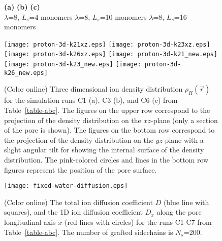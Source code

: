 \documentclass[3p,english,preprint]{elsarticle}
\begin{document}
\begin{figure}[!ht]  \hspace{2cm}
{\Large \bf(a)}   \hspace{4.5cm} {\Large \bf (b)}   \hspace{5cm}  {\Large \bf (c)}   \\
 \hspace{1.0cm} $\lambda$=8, $L_s$=4  monomers  
 \hspace{2cm}   $\lambda$=8, $L_s$=10 monomers  
 \hspace{2cm}   $\lambda$=8, $L_s$=16 monomers 

\texttt{[image: proton-3d-k21xz.eps]} 
\texttt{[image: proton-3d-k23xz.eps]}
\texttt{[image: proton-3d-k26xz.eps]}
\texttt{[image: proton-3d-k21\_new.eps]}
\texttt{[image: proton-3d-k23\_new.eps]}
\texttt{[image: proton-3d-k26\_new.eps]}
\caption{(Color online)   Three dimensional ion  density distribution 
$\rho_H(\vec r)$ for the simulation runs C1 (a), C3 (b), and C6 (c) from
   Table~\ref{table-abc}. 
The figures on the upper row correspond to  
the projection of the density distribution 
on the $xz$-plane (only a section of the pore is shown).   
The figures on the bottom  row correspond to
the  projection of the density distribution 
on the $yz$-plane with a slight angular tilt for showing the internal
surface of the density distribution. The pink-colored circles and lines in the 
bottom row figures represent the position of the pore  surface. 
 \label{fig-14-new}}
\end{figure}
\begin{figure}[!ht]
\begin{center}
\texttt{[image: fixed-water-diffusion.eps]}
\end{center}
\vspace{-0.75cm}
\caption{(Color online) 
The total ion  diffusion coefficient $D$ 
(blue line with squares), and the 1D ion diffusion 
coefficient $D_x$ along the pore longitudinal axis $x$ 
(red lines with circles)
for  the runs C1-C7 from  Table~\ref{table-abc}. 
The number of grafted sidechains is  $N_s$=200. 
 \label{fig-15-new}}
\end{figure}
\end{document}
